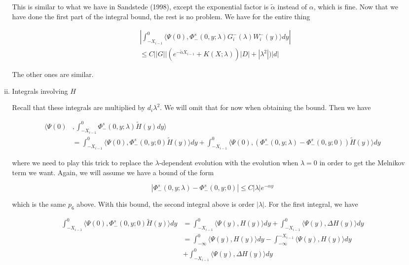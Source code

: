 \documentclass[12pt]{article}
\begin{document}
\begin{enumerate}
\begin{enumerate}[(i)]
This is similar to what we have in Sandstede (1998), except the exponential factor is $\tilde{\alpha}$ instead of $\alpha$, which is fine. Now that we have done the first part of the integral bound, the rest is no problem. We have for the entire thing 

\begin{align*}
&\left| \int_{-X_{i-1}}^0 \langle \Psi(0), \Phi^s_-(0, y; \lambda) G_i^-(\lambda)W_i^-(y) \rangle dy \right| \\
&\leq C ||G|| ( e^{-\tilde{\alpha} X_{i-1}} + K(X; \lambda))|D| + |\lambda^2|)|d|
\end{align*}

The other ones are similar.

\item Integrals involving $H$

Recall that these integrals are multiplied by $d_i \lambda^2$. We will omit that for now when obtaining the bound. Then we have

\begin{align*}
\langle \Psi(0)&, \int_{-X_{i-1}}^0 \Phi^s_-(0, y; \lambda) \tilde{H}(y) dy \rangle \\ 
&= \int_{-X_{i-1}}^0 \langle \Psi(0), \Phi^s_-(0, y; 0) \tilde{H}(y) \rangle dy + 
\int_{-X_{i-1}}^0 \langle \Psi(0), (\Phi^s_-(0, y; \lambda) - \Phi^s_-(0, y; 0)) \tilde{H}(y) \rangle dy
\end{align*}

where we need to play this trick to replace the $\lambda$-dependent evolution with the evolution when $\lambda = 0$ in order to get the Melnikov term we want. Again, we will assume we have a bound of the form

\[
|\Phi^s_-(0, y; \lambda) - \Phi^s_-(0, y; 0)| \leq C |\lambda| e^{-\alpha y}
\]

which is the same $p_6$ above. With this bound, the second integral above is order $|\lambda|$. For the first integral, we have 

\begin{align*}
\int_{-X_{i-1}}^0 \langle \Psi(0), \Phi^s_-(0, y; 0) \tilde{H}(y) \rangle dy &= 
\int_{-X_{i-1}}^0 \langle \Psi(y), H(y) \rangle dy + \int_{-X_{i-1}}^0 \langle \Psi(y), \Delta H(y) \rangle dy \\
&= \int_{-\infty}^0 \langle \Psi(y), H(y) \rangle dy - \int_{-\infty}^{-X_{i-1}} \langle \Psi(y), H(y) \rangle dy \\
&+ \int_{-X_{i-1}}^0 \langle \Psi(y), \Delta H(y) \rangle dy 
\end{align*}


\end{enumerate}
\end{enumerate}
\end{document}
